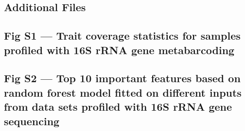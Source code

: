 \documentclass{bmcart}
\begin{document}
\begin{backmatter}






\section*{Additional Files}
  \subsection*{Fig S1 --- Trait coverage statistics for samples profiled with 16S rRNA gene metabarcoding}
  \subsection*{Fig S2 --- Top 10 important features based on random forest model fitted on different inputs from data sets profiled with 16S rRNA gene sequencing}

\end{backmatter}
\end{document}
